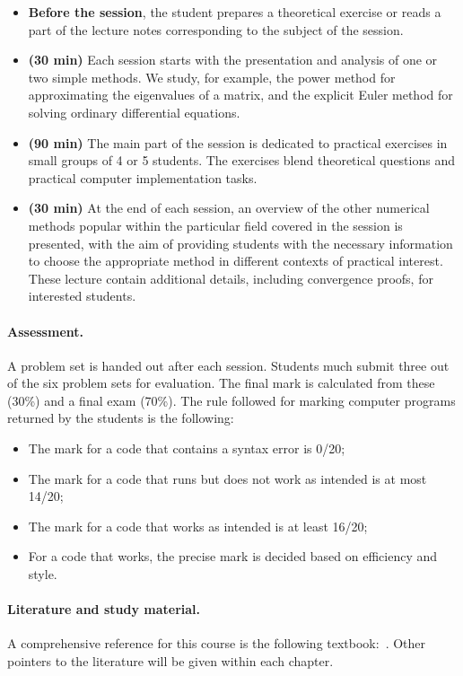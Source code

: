 \begin{itemize}
    \itemsep1em
    \item
        \textbf{Before the session}, the student prepares a theoretical exercise or
        reads a part of the lecture notes corresponding to the subject of the session.

    \item
        \textbf{(30 min)}
        Each session starts with the presentation and analysis of one or two simple methods.
        We study, for example,
        the power method for approximating the eigenvalues of a matrix,
        and the explicit Euler method for solving ordinary differential equations.

    \item
        \textbf{(90 min)}
        The main part of the session is dedicated to practical exercises in small groups of 4 or 5 students.
        The exercises blend theoretical questions and practical computer implementation tasks.

    \item
        \textbf{(30 min)}
        At the end of each session,
        an overview of the other numerical methods popular within the particular field covered in the session is presented,
        with the aim of providing students with the necessary information to choose the appropriate method in different contexts of practical interest.
        These lecture contain additional details,
        including convergence proofs, for interested students.
\end{itemize}

\paragraph{Assessment.}%
\label{par:assessment}
A problem set is handed out after each session.
Students much submit three out of the six problem sets for evaluation.
The final mark is calculated from these (30\%) and a final exam (70\%).
The rule followed for marking computer programs returned by the students is the following:
\begin{itemize}
    \item The mark for a code that contains a syntax error is 0/20;
    \item The mark for a code that runs but does not work as intended is at most 14/20;
    \item The mark for a code that works as intended is at least 16/20;
    \item For a code that works, the precise mark is decided based on efficiency and style.
\end{itemize}

\paragraph{Literature and study material.}%
A comprehensive reference for this course is the following textbook:~.
Other pointers to the literature will be given within each chapter.
